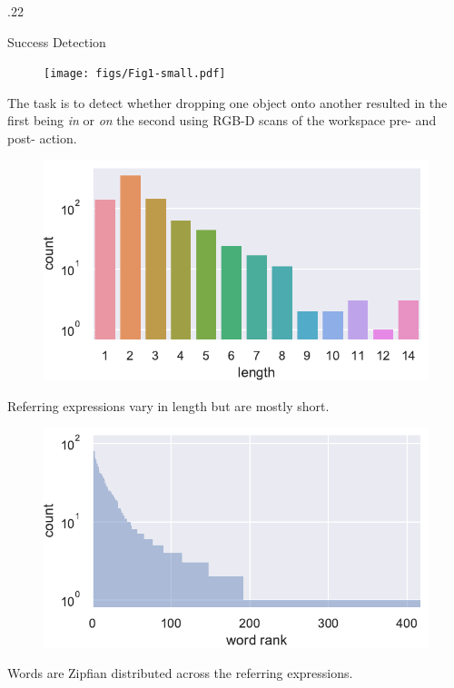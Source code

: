 \documentclass[final]{beamer}
\newcommand{\IN}{\textit{in}}
\newcommand{\ON}{\textit{on}}
\newcommand{\setblocksize}{\LARGE \centering}
\newcommand{\paragraphbreak}{\vspace{1cm}}
\newcommand{\sidecolumnwidth}{.22}
\begin{document}
\begin{frame}{}
\begin{columns}[t]
\begin{column}{\sidecolumnwidth\linewidth}
\begin{block}{\setblocksize Success Detection}
{\begin{figure}[!t]
  \centering
  \texttt{[image: figs/Fig1-small.pdf]}
\end{figure}
The task is to detect whether dropping one object onto another resulted in the first being \IN{} or \ON{} the second using RGB-D scans of the workspace pre- and post- action.
\paragraphbreak

\begin{figure}[t]
    \centering
    \includegraphics[width=\linewidth]{figs/lengths.pdf}
    \vspace{-10pt}
\end{figure}
Referring expressions vary in length but are mostly short.
\paragraphbreak

\begin{figure}[t]
    \centering
    \includegraphics[width=\linewidth]{figs/freqs.pdf}
    \vspace{-10pt}
\end{figure}
Words are Zipfian distributed across the referring expressions.

}
\end{block}


\end{column}
\end{columns}
\end{frame}
\end{document}
